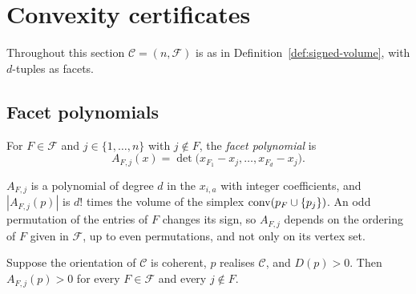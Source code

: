 \section{Convexity certificates}
\label{sec:convexity}

Throughout this section $\mathcal{C} = (n, \mathcal{F})$ is as in
Definition~\ref{def:signed-volume}, with $d$-tuples as facets.

\subsection{Facet polynomials}

\begin{definition}
  \label{def:facet-polynomial}
  For $F \in \mathcal{F}$ and $j \in \{1, \ldots, n\}$ with $j \notin F$, the
  \emph{facet polynomial} is
  \begin{equation}
    \label{eq:facet-polynomial}
    A_{F,j}(x) = \det\bigl(x_{F_{1}} - x_{j}, \ldots, x_{F_{d}} - x_{j}\bigr).
  \end{equation}
\end{definition}

$A_{F,j}$ is a polynomial of degree $d$ in the $x_{i,a}$ with integer
coefficients, and $|A_{F,j}(p)|$ is $d!$ times the volume of the simplex
$\operatorname{conv}(p_{F} \cup \{p_{j}\})$. An odd permutation of the entries of $F$
changes its sign, so $A_{F,j}$ depends on the ordering of $F$ given in
$\mathcal{F}$, up to even permutations, and not only on its vertex set.

\begin{lemma}
  \label{lem:facet-sign}
  Suppose the orientation of $\mathcal{C}$ is coherent, $p$ realises
  $\mathcal{C}$, and $D(p) > 0$. Then $A_{F,j}(p) > 0$ for every
  $F \in \mathcal{F}$ and every $j \notin F$.
\end{lemma}

